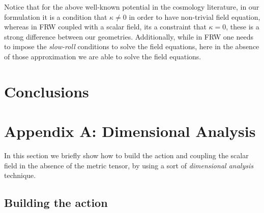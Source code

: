 \documentclass[10pt,a4paper]{article}
\begin{document}
Notice that for the above well-known potential in the cosmology literature, in our formulation it is a condition that $\kappa \neq 0$ in order
to have non-trivial field equation, whereas in FRW coupled with a scalar field, its a constraint that $\kappa = 0$, these is a strong difference
between our geometries. Additionally, while in FRW one needs to impose the \textit{slow-roll} conditions to solve the field equations, here
in the absence of those approximation we are able to solve the field equations.

\section{Conclusions}


\section{Appendix A: Dimensional Analysis}

In this section we briefly show how to build the action and coupling the scalar field in the absence of the metric tensor, by using a sort of
\textit{dimensional analysis} technique.

\subsection{Building the action}
\end{document}
